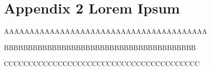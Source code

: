 
%


\chapter{Appendix 2 Lorem Ipsum}
\label{app:lorem_ipsum2}

\cite{wiki:sound-restaurants}
\cite{cite-mopidy}
\cite{cit-multiaudio}

\begin{newpdflayout}{210mm}{297mm}%

AAAAAAAAAAAAAAAAAAAAAAAAAAAAAAAAAAAAAAAA

\lipsum[1-9]

BBBBBBBBBBBBBBBBBBBBBBBBBBBBBBBBBBBBBBBB
\end{newpdflayout}

CCCCCCCCCCCCCCCCCCCCCCCCCCCCCCCCCCCCCCCC

\lipsum[1-10]
